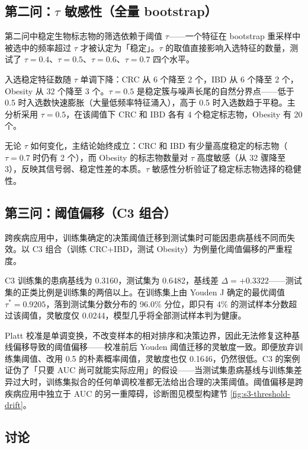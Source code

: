 \subsection{\texorpdfstring{第二问：$\tau$ 敏感性（全量 bootstrap）}{第二问：tau 敏感性（全量 bootstrap）}}

第二问中稳定生物标志物的筛选依赖于阈值 $\tau$——一个特征在 bootstrap 重采样中被选中的频率超过 $\tau$ 才被认定为「稳定」。$\tau$ 的取值直接影响入选特征的数量，测试了 $\tau=0.4$、$\tau=0.5$、$\tau=0.6$、$\tau=0.7$ 四个水平。

入选稳定特征数随 $\tau$ 单调下降：CRC 从 6 个降至 2 个，IBD 从 6 个降至 2 个，Obesity 从 32 个降至 3 个。$\tau=0.5$ 是稳定簇与噪声长尾的自然分界点——低于 0.5 时入选数快速膨胀（大量低频率特征涌入），高于 0.5 时入选数趋于平稳。主分析采用 $\tau=0.5$，在该阈值下 CRC 和 IBD 各有 4 个稳定标志物，Obesity 有 20 个。

无论 $\tau$ 如何变化，主结论始终成立：CRC 和 IBD 有少量高度稳定的标志物（$\tau=0.7$ 时仍有 2 个），而 Obesity 的标志物数量对 $\tau$ 高度敏感（从 32 骤降至 3），反映其信号弱、稳定性差的本质。$\tau$ 敏感性分析验证了稳定标志物选择的稳健性。

\subsection{第三问：阈值偏移（C3 组合）}

{\raggedright
跨疾病应用中，训练集确定的决策阈值迁移到测试集时可能因患病基线不同而失效。以 C3 组合（训练 CRC+IBD，测试 Obesity）为例量化阈值偏移的严重程度。\par}

C3 训练集的患病基线为 0.3160，测试集为 0.6482，基线差 $\Delta=+0.3322$——测试集的正类比例是训练集的两倍以上。在训练集上由 Youden J 确定的最优阈值 $\tau^{*}=0.9205$，落到测试集分数分布的 96.0\% 分位，即只有 4\% 的测试样本分数超过该阈值，灵敏度仅 0.0244，模型几乎将全部测试样本判为健康。

Platt 校准是单调变换，不改变样本的相对排序和决策边界，因此无法修复这种基线偏移导致的阈值偏移——校准前后 Youden 阈值迁移的灵敏度一致。即便放弃训练集阈值、改用 0.5 的朴素概率阈值，灵敏度也仅 0.1646，仍然很低。C3 的案例证伪了「只要 AUC 尚可就能实际应用」的假设——当测试集患病基线与训练集差异过大时，训练集拟合的任何单调校准都无法给出合理的决策阈值。阈值偏移是跨疾病应用中独立于 AUC 的另一重障碍，诊断图见模型构建节 \cref{fig:s3-threshold-drift}。
\fussy

\subsection{讨论}

